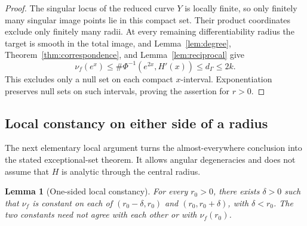 \documentclass[11pt,reqno]{amsart}
\newtheorem{lemma}[theorem]{Lemma}
\theoremstyle{remark}
\numberwithin{equation}{section}
\begin{document}
\begin{proof}
The singular locus of the reduced curve $Y$ is locally finite, so
only finitely many singular image points lie in this compact set.
Their product coordinates exclude only finitely many radii. At every
remaining differentiability radius the target is smooth in the total
image, and Lemma~\ref{lem:degree}, Theorem~\ref{thm:correspondence}, and
Lemma~\ref{lem:reciprocal} give
\[
 \nu_f(e^x)
 \le\#\Phi^{-1}(e^{2x},H'(x))
 \le d_\Gamma\le2k.
\]
This excludes only a null set on each compact $x$-interval.
Exponentiation preserves null sets on such intervals, proving the
assertion for $r>0$.
\end{proof}

\subsection{Local constancy on either side of a radius}
The next elementary local argument turns the almost-everywhere
conclusion into the stated exceptional-set theorem. It allows angular
degeneracies and does not assume that $H$ is analytic through the
central radius.

\begin{lemma}[One-sided local constancy]\label{lem:onesided}
For every $r_0>0$, there exists $\delta>0$ such that $\nu_f$ is
constant on each of $(r_0-\delta,r_0)$ and $(r_0,r_0+\delta)$,
with $\delta<r_0$.
The two constants need not agree with each other or with $\nu_f(r_0)$.
\end{lemma}
\end{document}

